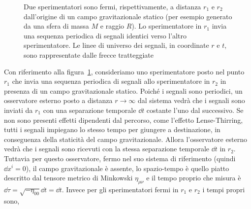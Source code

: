 \begin{figure}
  \centering
  \caption[Dilatazione gravitazionale dei tempi e redshift]{Due sperimentatori
    sono fermi, rispettivamente, a distanza $r_{1}$ e $r_{2}$ dall'origine di un
    campo gravitazionale statico (per esempio generato da una sfera di massa $M$
    e raggio $R$).  Lo sperimentatore in $r_{1}$ invia una sequenza periodica di
    segnali identici verso l'altro sperimentatore.  Le linee di universo dei
    segnali, in coordinate $r$ e $t$, sono rappresentate dalle frecce
    tratteggiate}
  \label{fig:redshift}
\end{figure}
Con riferimento alla figura~\ref{fig:redshift}, consideriamo uno sperimentatore
posto nel punto $r_{1}$ che invia una sequenza periodica di segnali allo
sperimentatore in $r_{2}$ in presenza di un campo gravitazionale statico.
Poiché i segnali sono periodici, un osservatore esterno posto a distanza
$r \to \infty$ dal sistema vedrà che i segnali sono inviati da $r_{1}$ con una
separazione temporale $\dd t$ costante l'uno dal successivo.  Se non sono
presenti effetti dipendenti dal percorso, come l'effetto Lense-Thirring, tutti i
segnali impiegano lo stesso tempo per giungere a destinazione, in conseguenza
della staticità del campo gravitazionale.  Allora l'osservatore esterno vedrà
che i segnali sono ricevuti con la stessa separazione temporale $\dd t$ in
$r_{2}$.  Tuttavia per questo osservatore, fermo nel suo sistema di riferimento
(quindi $\dd x^{i} = 0$), il campo gravitazionale è assente, lo spazio-tempo è
quello piatto descritto dal tensore metrico di Minkowski $\eta_{\mu\nu}$ e il
tempo proprio che misura è $\dd\tau = \sqrt{-\eta_{00}}\dd t = \dd t$.  Invece
per gli sperimentatori fermi in $r_{1}$ e $r_{2}$ i tempi propri sono,
